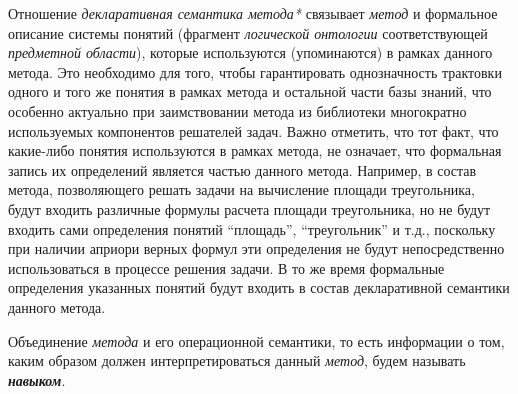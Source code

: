 \begin{SCn}
	\begin{scnindent}
		\begin{scnindent}
		\end{scnindent}
	\end{scnindent}

\end{SCn}

Отношение \textit{декларативная семантика метода*} связывает \textit{метод} и формальное описание системы понятий (фрагмент \textit{логической онтологии} соответствующей \textit{предметной области}), которые используются (упоминаются) в рамках данного метода. Это необходимо для того, чтобы гарантировать однозначность трактовки одного и того же понятия в рамках метода и остальной части базы знаний, что особенно актуально при заимствовании метода из библиотеки многократно используемых компонентов решателей задач. Важно отметить, что тот факт, что какие-либо понятия используются в рамках метода, не означает, что формальная запись их определений является частью данного метода. Например, в состав метода, позволяющего решать задачи на вычисление площади треугольника, будут входить различные формулы расчета площади треугольника, но не будут входить сами определения понятий ``площадь'', ``треугольник'' и т.д., поскольку при наличии априори верных формул эти определения не будут непосредственно использоваться в процессе решения задачи. В то же время формальные определения указанных понятий будут входить в состав декларативной семантики данного метода.

Объединение \textit{метода} и его операционной семантики, то есть информации о том, каким образом должен интерпретироваться данный \textit{метод}, будем называть \textbf{\textit{навыком}}.

